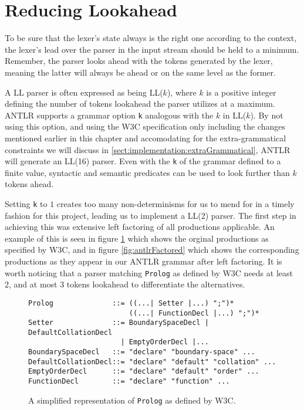 \section{Reducing Lookahead}
\label{sect:implementation:reduceLookahead}
To be sure that the lexer's state always is the right one according to the context, the lexer's lead over the parser in the input stream should be held to a minimum. Remember, the parser looks ahead with the tokens generated by the lexer, meaning the latter will always be ahead or on the same level as the former.

A LL parser is often expressed as being LL($k$), where $k$ is a positive integer defining the number of tokens lookahead the parser utilizes at a maximum. ANTLR supports a grammar option \verb!k! analogous with the $k$ in LL($k$). By not using this option, and using the W3C specification only including the changes mentioned earlier in this chapter and accomodating for the extra-grammatical constraints we will discuss in \ref{sect:implementation:extraGrammatical}, ANTLR will generate an LL(16) parser. Even with the \verb!k! of the grammar defined to a finite value, syntactic and semantic predicates can be used to look further than $k$ tokens ahead. 

Setting \verb!k! to $1$ creates too many non-determinisms for us to mend for in a timely fashion for this project, leading us to implement a LL(2) parser. The first step in achieving this was extensive left factoring of all productions applicable. An example of this is seen in figure \ref{fig:w3cUnfactored} which shows the orginal productions as specified by W3C, and in figure \ref{fig:antlrFactored} which shows the corresponding productions as they appear in our ANTLR grammar after left factoring. It is worth noticing that a parser matching \verb!Prolog! as defined by W3C needs at least 2, and at most 3 tokens lookahead to differentiate the alternatives.

\begin{figure}[h!]
\begin{Verbatim}
Prolog              ::= ((...| Setter |...) ";")* 
                        ((...| FunctionDecl |...) ";")*
Setter              ::= BoundarySpaceDecl | DefaultCollationDecl 
                      | EmptyOrderDecl |...
BoundarySpaceDecl   ::= "declare" "boundary-space" ...
DefaultCollationDecl::= "declare" "default" "collation" ...
EmptyOrderDecl      ::= "declare" "default" "order" ...
FunctionDecl        ::= "declare" "function" ...
\end{Verbatim}
\label{fig:w3cUnfactored}
\caption[\texttt{Prolog} as defined by W3C]{A simplified representation of \texttt{Prolog} as defined by W3C.}
\end{figure}

